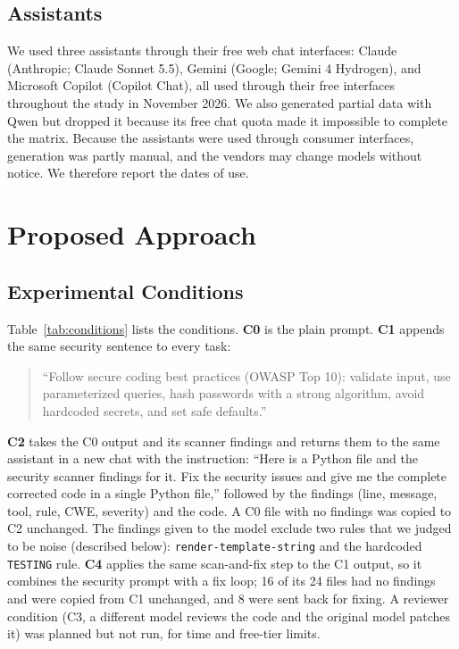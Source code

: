 \documentclass[conference]{IEEEtran}
\begin{document}
\subsection{Assistants}
We used three assistants through their free web chat interfaces: Claude (Anthropic; Claude Sonnet 5.5), Gemini (Google; Gemini 4 Hydrogen), and Microsoft Copilot (Copilot Chat), all used through their free interfaces throughout the study in November 2026. We also generated partial data with Qwen but dropped it because its free chat quota made it impossible to complete the matrix. Because the assistants were used through consumer interfaces, generation was partly manual, and the vendors may change models without notice. We therefore report the dates of use.

\section{Proposed Approach}
\subsection{Experimental Conditions}
Table~\ref{tab:conditions} lists the conditions. \textbf{C0} is the plain prompt. \textbf{C1} appends the same security sentence to every task:

\begin{quote}\small
``Follow secure coding best practices (OWASP Top 10): validate input, use parameterized queries, hash passwords with a strong algorithm, avoid hardcoded secrets, and set safe defaults.''
\end{quote}

\textbf{C2} takes the C0 output and its scanner findings and returns them to the same assistant in a new chat with the instruction: ``Here is a Python file and the security scanner findings for it. Fix the security issues and give me the complete corrected code in a single Python file,'' followed by the findings (line, message, tool, rule, CWE, severity) and the code. A C0 file with no findings was copied to C2 unchanged. The findings given to the model exclude two rules that we judged to be noise (described below): \texttt{render-template-string} and the hardcoded \texttt{TESTING} rule. \textbf{C4} applies the same scan-and-fix step to the C1 output, so it combines the security prompt with a fix loop; 16 of its 24 files had no findings and were copied from C1 unchanged, and 8 were sent back for fixing. A reviewer condition (C3, a different model reviews the code and the original model patches it) was planned but not run, for time and free-tier limits.
\end{document}

